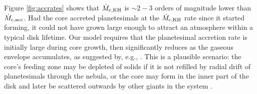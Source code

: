 Figure \ref{fig:accrates} shows that $\dot{M}_{\rm c,KH}$ is $\sim2-3$ orders of magnitude lower than $\dot{M}_{\rm c, acc}$. Had the core accreted planetesimals at the $\dot{M}_{\rm c, KH}$ rate since it started forming, it could not have grown large enough to attract an atmosphere within a typical disk lifetime. Our model requires that the planetesimal accretion rate is initially large during core growth, then significantly reduces as the gaseous envelope accumulates, as suggested by, e.g., \citet{pollack96}. This is a plausible scenario: the core's feeding zone may be depleted of solids if it is not refilled by radial drift of planetesimals through the nebula, or the core may form in the inner part of the disk and later be scattered outwards by other giants in the system \citep{ida13}. 



